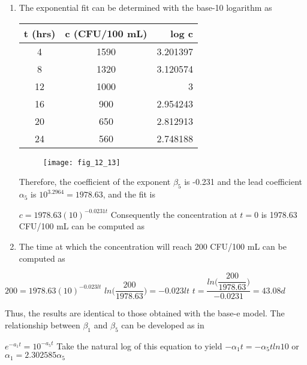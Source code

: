 \documentclass[../main.tex]{subfiles}
\begin{document}
\section{}
\begin{enumerate}[label=\bfseries(\alph*)]
\item The exponential fit can be determined with the base-10 logarithm as
\bigbreak
	\begin{tabular}{|c|c|r|}
		\hline t (hrs)&c (CFU/100 mL)&log c\\ \hline
			4&1590&3.201397\\ \hline
			8&1320&3.120574\\ \hline
			12&1000&3\\ \hline
			16&900&2.954243\\ \hline
			20&650&2.812913\\ \hline
			24&560&2.748188\\ \hline
	\end{tabular}
	\bigbreak
	\begin{figure}[H]
		\texttt{[image: fig\_12\_13]}
		\label{fig:fig_12_13}
	\end{figure}
	\bigbreak
\begin{blockquote}
Therefore, the coefficient of the exponent $\beta_5$ is -0.231 and the lead coefficient $\alpha_5$ is $10^{3.2964} = 1978.63$, and the fit is 
\end{blockquote}
	\bigbreak
$c=1978.63(10)^{-0.0231t}$
	\bigbreak
Consequently the concentration at $t=0$ is 1978.63 CFU/100 mL can be computed as
\item The time at which the concentration will reach 200 CFU/100 mL can be computed as
\end{enumerate}
	\bigbreak 
$200=1978.63(10)^{-0.023lt}$
	\bigbreak
$ln\Big(\dfrac{200}{1978.63}\Big)=-0.023lt$
	\bigbreak
$t=\dfrac{ln\Big(\dfrac{200}{1978.63}\Big)}{-0.0231}=43.08d$
	\bigbreak
\begin{blockquote}
Thus, the results are identical to those obtained with the base-e model. The relationship between $\beta_1$ and $\beta_5$ can be developed as in 
\end{blockquote}
	\bigbreak
$e^{-a_1t}=10^{-a_5t}$
	\bigbreak
Take the natural log of this equation to yield
	\bigbreak
$-\alpha_1t=-\alpha_5tln10$
	\bigbreak
or
	\bigbreak
$\alpha_1=2.302585\alpha_5$
	\bigbreak
\end{document}
